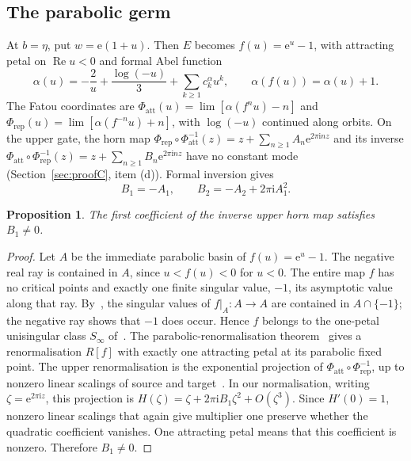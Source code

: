 \documentclass[11pt]{amsart}
\newtheorem{proposition}[theorem]{Proposition}
\theoremstyle{definition}
\newcommand{\eee}{\mathrm{e}}
\newcommand{\ii}{\mathrm{i}}
\begin{document}
\subsection{The parabolic germ}\label{sec:horn}
At $b=\eta$, put $w=\eee(1+u)$.  Then $E$ becomes $f(u)=\eee^u-1$, with attracting
petal on $\operatorname{Re}u<0$ and formal Abel function
\begin{equation}\label{eq:alpha}
 \alpha(u)=-\frac2u+\frac{\log(-u)}3+\sum_{k\ge1}c^{\alpha}_ku^k,\qquad
 \alpha(f(u))=\alpha(u)+1 .
\end{equation}
The Fatou coordinates are
$\Phi_{\mathrm{att}}(u)=\lim[\alpha(f^nu)-n]$ and
$\Phi_{\mathrm{rep}}(u)=\lim[\alpha(f^{-n}u)+n]$, with $\log(-u)$ continued along
orbits.  On the upper gate, the horn map
$\Phi_{\mathrm{rep}}\circ\Phi_{\mathrm{att}}^{-1}(z)=z+\sum_{n\ge1}A_n\eee^{2\pi\ii nz}$
and its inverse
$\Phi_{\mathrm{att}}\circ\Phi_{\mathrm{rep}}^{-1}(z)=z+\sum_{n\ge1}B_n\eee^{2\pi\ii nz}$
have no constant mode (Section~\ref{sec:proofC}, item (d)).  Formal inversion
gives
\begin{equation}\label{eq:Bn}
 B_1=-A_1,\qquad B_2=-A_2+2\pi\ii A_1^2 .
\end{equation}
\begin{proposition}\label{prop:horn-nonzero}
The first coefficient of the inverse upper horn map satisfies $B_1\ne0$.
\end{proposition}
\begin{proof}
Let $A$ be the immediate parabolic basin of $f(u)=\eee^u-1$.  The negative
real ray is contained in $A$, since $u<f(u)<0$ for $u<0$.  The entire map
$f$ has no critical points and exactly one finite singular value, $-1$,
its asymptotic value along that ray.  By~\cite[Lemma~87]{Cheritat2022},
the singular values of $f|_A:A\to A$ are contained in $A\cap\{-1\}$;
the negative ray shows that $-1$ does occur.  Hence $f$ belongs to the
one-petal unisingular class $S_\infty$ of~\cite[Definition~8]{Cheritat2022}.
The parabolic-renormalisation theorem~\cite[Theorem~9 and
Corollary~11]{Cheritat2022} gives a renormalisation $R[f]$ with exactly
one attracting petal at its parabolic fixed point.  The upper
renormalisation is the exponential projection of
$\Phi_{\mathrm{att}}\circ\Phi_{\mathrm{rep}}^{-1}$, up to nonzero linear
scalings of source and target~\cite[Appendix~A]{Cheritat2022}.  In our
normalisation, writing $\zeta=\eee^{2\pi\ii z}$, this projection is
$H(\zeta)=\zeta+2\pi\ii B_1\zeta^2+O(\zeta^3)$.  Since $H'(0)=1$,
nonzero linear scalings that again give multiplier one preserve whether
the quadratic coefficient vanishes.  One attracting petal means that
this coefficient is nonzero.  Therefore $B_1\ne0$.
\end{proof}
\end{document}
